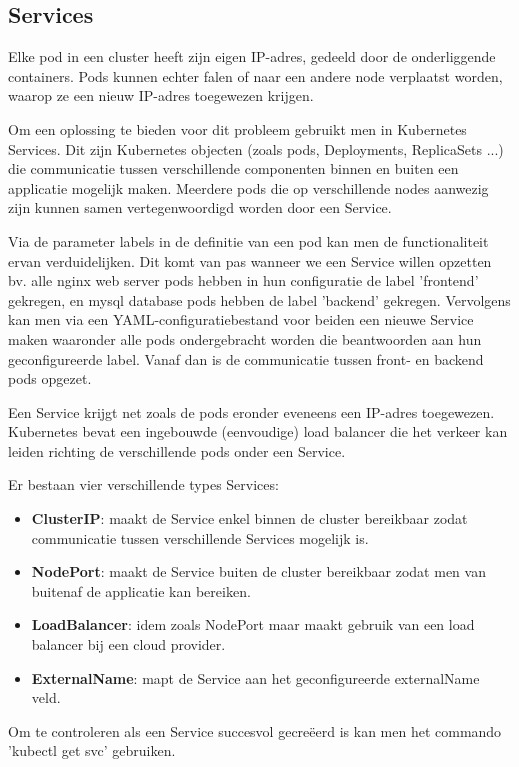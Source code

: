 \subsection{Services}
\label{sec:services}

Elke pod in een cluster heeft zijn eigen IP-adres, gedeeld door de onderliggende containers. Pods kunnen echter falen of naar een andere node verplaatst worden, waarop ze een nieuw IP-adres toegewezen krijgen.

Om een oplossing te bieden voor dit probleem gebruikt men in Kubernetes Services. Dit zijn Kubernetes objecten (zoals pods, Deployments, ReplicaSets ...) die communicatie tussen verschillende componenten binnen en buiten een applicatie mogelijk maken. Meerdere pods die op verschillende nodes aanwezig zijn kunnen samen vertegenwoordigd worden door een Service. 

Via de parameter labels in de definitie van een pod kan men de functionaliteit ervan verduidelijken. Dit komt van pas wanneer we een Service willen opzetten bv. alle nginx web server pods hebben in hun configuratie de label 'frontend' gekregen, en mysql database pods hebben de label 'backend' gekregen. Vervolgens kan men via een YAML-configuratiebestand voor beiden een nieuwe Service maken waaronder alle pods ondergebracht worden die beantwoorden aan hun geconfigureerde label. Vanaf dan is de communicatie tussen front- en backend pods opgezet. 

Een Service krijgt net zoals de pods eronder eveneens een IP-adres toegewezen. Kubernetes bevat een ingebouwde (eenvoudige) load balancer die het verkeer kan leiden richting de verschillende pods onder een Service. 

Er bestaan vier verschillende types Services: 
\begin{itemize}
    \item {\bf ClusterIP}: maakt de Service enkel binnen de cluster bereikbaar zodat communicatie tussen verschillende Services mogelijk is.  
    \item {\bf NodePort}: maakt de Service buiten de cluster bereikbaar zodat men van buitenaf de applicatie kan bereiken.
    \item {\bf LoadBalancer}: idem zoals NodePort maar maakt gebruik van een load balancer bij een cloud provider.
    \item {\bf ExternalName}: mapt de Service aan het geconfigureerde externalName veld.     
\end{itemize}

Om te controleren als een Service succesvol gecreëerd is kan men het commando 'kubectl get svc' gebruiken. 

